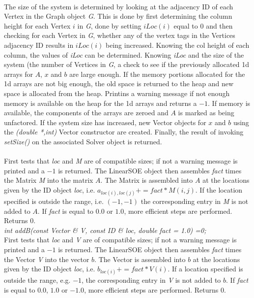  \\ 
The size of the system is determined by looking at the adjacency ID of
each Vertex in the Graph object {\em G}. This is done by first
determining the column height for each Vertex $i$ in {\em G}, done by
setting $iLoc(i)$ equal to $0$ and then checking for each Vertex
in {\em G}, whether any of the vertex tags in the Vertices adjacency
ID results in $iLoc(i)$ being increased. Knowing the col height of
each column, the values of {\em iLoc} can be determined. Knowing {\em
iLoc} and the size of the system (the number of Vertices in {\em G}, 
a check to see if the previously allocated 1d arrays for $A$, $x$ and
$b$ are large enough. If the memory portions allocated for the 1d
arrays are not big enough, the old space is returned to the heap and
new space is allocated from the heap. Printins a warning message if
not enough memory is available on the heap for the 1d arrays and
returns a $-1$. If memory is available, the components of the arrays
are zeroed and $A$ is marked as being unfactored. If the system size
has increased, new Vector objects for $x$ and $b$ using the {\em
(double *,int)} Vector constructor are created. Finally, the result of 
invoking {\em setSize()} on the associated Solver object is
returned. \\ 


 \\
First tests that {\em loc} and {\em M} are of compatible sizes; if not
a warning message is printed and a $-1$ is returned. The LinearSOE
object then assembles {\em fact} times the Matrix {\em 
M} into the matrix $A$. The Matrix is assembled into $A$ at the
locations given by the ID object {\em loc}, i.e. $a_{loc(i),loc(j)} +=
fact * M(i,j)$. If the location specified is outside the range,
i.e. $(-1,-1)$ the corresponding entry in {\em M} is not added to
$A$. If {\em fact} is equal to $0.0$ or $1.0$, more efficient steps
are performed. Returns $0$.  \\


{\em int addB(const Vector \& V, const ID \& loc,
double fact = 1.0) =0;} \\
First tests that {\em loc} and {\em V} are of compatible sizes; if not
a warning message is printed and a $-1$ is returned. The LinearSOE
object then assembles {\em fact} times the Vector {\em V} into
the vector $b$. The Vector is assembled into $b$ at the locations
given by the ID object {\em loc}, i.e. $b_{loc(i)} += fact * V(i)$. If a
location specified is outside the range, e.g. $-1$, the corresponding
entry in {\em V} is not added to $b$. If {\em fact} is equal to $0.0$,
$1.0$ or $-1.0$, more efficient steps are performed. Returns $0$. \\



